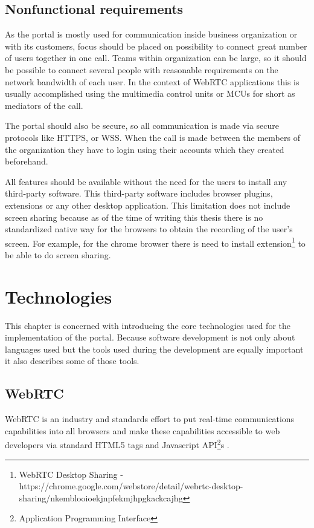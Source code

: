 \documentclass[
  digital, %
  table,   %
  lof,     %
  nolot,     %
]{fithesis3}
\begin{document}
\section{Nonfunctional requirements}
As the portal is mostly used for communication inside business organization or with its customers, focus should be placed on possibility to connect great number of users together in one call. Teams within organization can be large, so it should be possible to connect several people with reasonable requirements on the network bandwidth of each user. In the context of WebRTC applications this is usually accomplished using the multimedia control units or MCUs for short as mediators of the call.

The portal should also be secure, so all communication is made via secure protocols like HTTPS, or WSS. When the call is made between the members of the organization they have to login using their accounts which they created beforehand. 

All features should be available without the need for the users to install any third-party software. This third-party software includes browser plugins, extensions or any other desktop application. This limitation does not include screen sharing because as of the time of writing this thesis there is no standardized native way for the browsers to obtain the recording of the user's screen. For example, for the chrome browser there is need to install extension\footnote{WebRTC Desktop Sharing - https://chrome.google.com/webstore/detail/webrtc-desktop-sharing/nkemblooioekjnpfekmjhpgkackcajhg} to be able to do screen sharing.

\chapter{Technologies}
This chapter is concerned with introducing the core technologies used for the implementation of the portal. Because software development is not only about languages used but the tools used during the development are equally important it also describes some of those tools.

\section{WebRTC}
WebRTC is an industry and standards effort to put real-time communications capabilities into all browsers and make these capabilities accessible to web developers via standard HTML5 tags and Javascript API\footnote{Application Programming Interface}s \cite{webrtcBook}.
\end{document}
